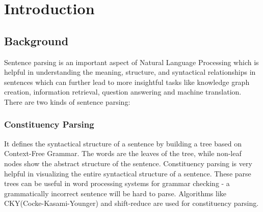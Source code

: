 \chapter{Introduction}

\section{Background}

Sentence parsing is an important aspect of Natural Language Processing which is
helpful in understanding the meaning, structure, and syntactical relationships
in sentences which can further lead to more insightful tasks like knowledge
graph creation, information retrieval, question answering and machine
translation.  There are two kinds of sentence parsing:
\subsection{Constituency Parsing}
        It defines the syntactical structure of a sentence by building a tree
        based on Context-Free Grammar. The words are the leaves of the tree,
        while non-leaf nodes show the abstract structure of the sentence.
        Constituency parsing is very helpful in visualizing the entire
        syntactical structure of a sentence. These parse trees can be
        useful in word processing systems for grammar checking - a
        grammatically incorrect sentence will be hard to parse. Algorithms like
        CKY(Cocke-Kasami-Younger) and shift-reduce are used for constituency
        parsing.
